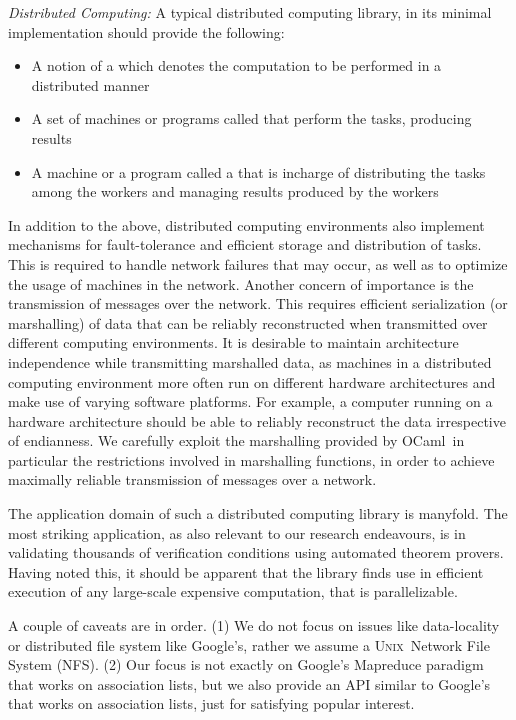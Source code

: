 \documentclass[preprint]{sigplanconf}
\newcommand{\Ocaml}{OCaml}
\newcommand{\unix}{\textsc{Unix}}
\begin{document}
\emph{Distributed Computing:} 
A typical distributed computing library, in its minimal implementation
should provide the following:
\begin{itemize}
\item A notion of a  which denotes the computation to be
  performed in a distributed manner
\item A set of machines or programs called  that perform
  the tasks, producing results
\item A machine or a program called a  that is incharge
  of distributing the tasks among the workers and managing results
  produced by the workers
\end{itemize}
In addition to the above, distributed computing environments also
implement mechanisms for fault-tolerance and efficient storage and
distribution of tasks. This is required to handle network failures
that may occur, as well as to optimize the usage of machines in the
network. Another concern of importance is the transmission of messages
over the network. This requires efficient serialization (or
marshalling) of data that can be reliably reconstructed when
transmitted over different computing environments.  It is desirable to
maintain architecture independence while transmitting marshalled data,
as machines in a distributed computing environment more often run on
different hardware architectures and make use of varying software
platforms. For example, a computer running on a hardware architecture
should be able to reliably reconstruct the data irrespective of
endianness. We carefully exploit the marshalling provided by \Ocaml\,
in particular the restrictions involved in marshalling functions, in
order to achieve maximally reliable transmission of messages over a
network.

The application domain of such a distributed computing library is
manyfold.  The most striking application, as also relevant to our
research endeavours, is in validating thousands of verification
conditions using automated theorem provers. Having noted this, it
should be apparent that the library finds use in efficient execution
of any large-scale expensive computation, that is parallelizable.

A couple of caveats are in order. (1) We do not focus on issues like
data-locality or distributed file system like Google's, rather we
assume a \unix\ Network File System (NFS). (2) Our focus is not
exactly on Google's Mapreduce paradigm~\cite{mapreduce} that works on
association lists, but we also provide an API similar to Google's that
works on association lists, just for satisfying popular interest.
\end{document}
